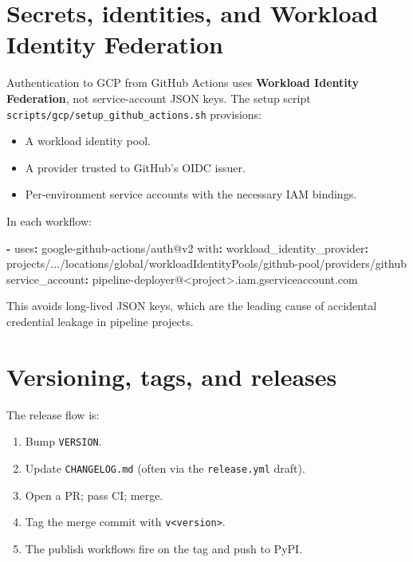 \documentclass[
  11pt,
  british,
  oneside]{book}
\newenvironment{Shaded}{\begin{snugshade}}{\end{snugshade}}
\newcommand{\AttributeTok}[1]{\textcolor[rgb]{0.77,0.63,0.00}{#1}}
\newcommand{\FunctionTok}[1]{\textcolor[rgb]{0.00,0.00,0.00}{#1}}
\newcommand{\KeywordTok}[1]{\textcolor[rgb]{0.13,0.29,0.53}{\textbf{#1}}}
\providecommand{\tightlist}{%
  \setlength{\itemsep}{0pt}\setlength{\parskip}{0pt}}
\begin{document}
\hypertarget{secrets-identities-and-workload-identity-federation}{%
\section{Secrets, identities, and Workload Identity
Federation}\label{secrets-identities-and-workload-identity-federation}}

Authentication to GCP from GitHub Actions uses \textbf{Workload Identity
Federation}, not service-account
JSON keys. The setup script
\texttt{scripts/gcp/setup\_github\_actions.sh} provisions:

\begin{itemize}
\tightlist
\item
  A workload identity pool.
\item
  A provider trusted to GitHub's OIDC issuer.
\item
  Per-environment service accounts with the necessary IAM bindings.
\end{itemize}

In each workflow:

\begin{Shaded}
\begin{Highlighting}[]
\KeywordTok{{-}}\AttributeTok{ }\FunctionTok{uses}\KeywordTok{:}\AttributeTok{ google{-}github{-}actions/auth@v2}
\AttributeTok{  }\FunctionTok{with}\KeywordTok{:}
\AttributeTok{    }\FunctionTok{workload\_identity\_provider}\KeywordTok{:}\AttributeTok{ projects/.../locations/global/workloadIdentityPools/github{-}pool/providers/github}
\AttributeTok{    }\FunctionTok{service\_account}\KeywordTok{:}\AttributeTok{ pipeline{-}deployer@\textless{}project\textgreater{}.iam.gserviceaccount.com}
\end{Highlighting}
\end{Shaded}

This avoids long-lived JSON keys, which are the leading cause of
accidental credential leakage in pipeline projects.

\hypertarget{versioning-tags-and-releases}{%
\section{Versioning, tags, and
releases}\label{versioning-tags-and-releases}}

The release flow is:

\begin{enumerate}
\def\labelenumi{\arabic{enumi}.}
\tightlist
\item
  Bump \texttt{VERSION}.
\item
  Update \texttt{CHANGELOG.md} (often via the \texttt{release.yml}
  draft).
\item
  Open a PR; pass CI; merge.
\item
  Tag the merge commit with \texttt{v\textless{}version\textgreater{}}.
\item
  The publish workflows fire on the tag and push to PyPI.
\end{enumerate}
\end{document}
